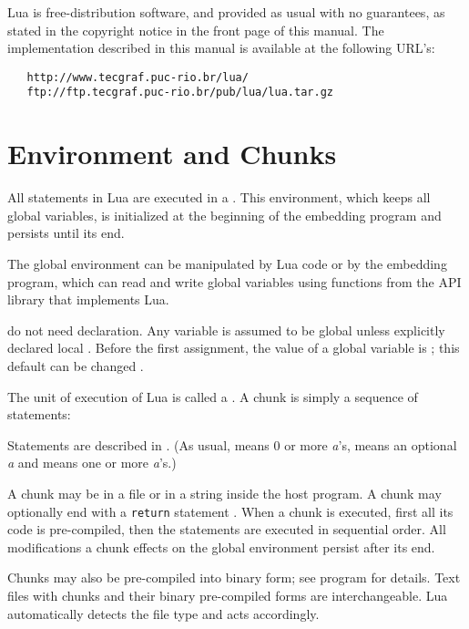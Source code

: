 Lua is free-distribution software,
and provided as usual with no guarantees,
as stated in the copyright notice in the front page of this manual.
The implementation described in this manual is available
at the following URL's:
\begin{verbatim}
   http://www.tecgraf.puc-rio.br/lua/
   ftp://ftp.tecgraf.puc-rio.br/pub/lua/lua.tar.gz
\end{verbatim}


\section{Environment and Chunks}

All statements in Lua are executed in a .
This environment, which keeps all global variables,
is initialized at the beginning of the embedding program and
persists until its end.

The global environment can be manipulated by Lua code or
by the embedding program,
which can read and write global variables
using functions from the API library that implements Lua.

 do not need declaration.
Any variable is assumed to be global unless explicitly declared local
.
Before the first assignment, the value of a global variable is \nil;
this default can be changed .

The unit of execution of Lua is called a .
A chunk is simply a sequence of statements:
\begin{Produc}
\end{Produc}%
Statements are described in .
(As usual,  means 0 or more \emph{a}'s,
 means an optional \emph{a} and  means
one or more \emph{a}'s.)

A chunk may be in a file or in a string inside the host program.
A chunk may optionally end with a \verb|return| statement .
When a chunk is executed, first all its code is pre-compiled,
then the statements are executed in sequential order.
All modifications a chunk effects on the global environment persist
after its end.

Chunks may also be pre-compiled into binary form;
see program  for details.
Text files with chunks and their binary pre-compiled forms
are interchangeable.
Lua automatically detects the file type and acts accordingly.

